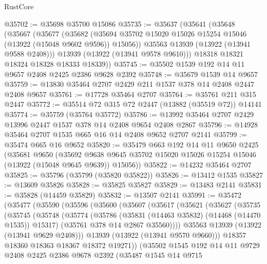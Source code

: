 \begin{lexlean}{RustCore}
\begin{coremodule}
@35702 := @35698 @35700 @15086
@35735 := @35637
    (@35641
      (@35648
        (@35667
          (@35677
            (@35682
              (@35694 @35702 @15020 @15026 @15254 @15046 (@13922 (@15048 @9602 @9596)) @15056))
            @35563
            @13939
            (@13922 (@13941 @9588 @2408)))
          @13939
          (@13922 (@13941 @9578 @9610)))
        @18318
        @18321
        @18324
        @18328
        @18333
        @18339))
@35745 := @35502 @1539 @192 @14 @11 @9657 @2408 @2425 @2386 @9628 @2392
@35748 := @35679 @1539 @14 @9657
@35759 := @13830 @35464 @2707 @2429 @211 @1537 @378 @14 @2408 @2447 @2408 @9657
@35761 := @17728 @35464 @2707
@35764 := @35761 @211 @315 @2447
@35772 := @35514 @72 @315 @72 @2447 (@13882 (@35519 @72)) @14141
@35774 := @35759 (@35764 @35772)
@35786 := @13992 @35464 @2707 @2429 @13996 @2447 @1537 @378 @14 @2408 @9654 @2408 @2867
@35796 := @14928 @35464 @2707 @1535 @665 @16 @14 @2408 @9652 @2707 @2141
@35799 := @35474 @665 @16 @9652
@35820 := @35479
    @663
    @192
    @14
    @11
    @9650
    @2425
    (@35681
      @9650
      (@35692 @9638 @9645 @35702 @15020 @15026 @15254 @15046 (@13922 (@15048 @9645 @9639)) @15056))
@35822 := @14232 @35464 @2707
@35825 := @35796 (@35799 (@35820 @35822))
@35826 := @13412 @1535
@35827 := @13609 @35826
@35828 := @35825 @35827
@35829 := @13483 @2141
@35831 := @35828 (@14459 @35829)
@35832 := @13507 @2141
@35991 := @35472
    (@35477
      (@35590
        (@35596
          (@35600
            (@35607
              (@35617
                (@35621
                  (@35627
                    (@35735
                      (@35745
                        (@35748
                          (@35774
                            (@35786
                              (@35831 (@14463 @35832) (@14468 (@14470 @1535)) @15317)
                              (@35761 @378 @14 @2867 @35560))))
                        @35563
                        @13939
                        (@13922 (@13941 @9629 @2408)))
                      @13939
                      (@13922 (@13941 @9570 @9660)))
                    @18357
                    @18360
                    @18363
                    @18367
                    @18372
                    @19271))
                (@35502
                  @1545
                  @192
                  @14
                  @11
                  @9729
                  @2408
                  @2425
                  @2386
                  @9678
                  @2392
                  (@35487
                    @1545
                    @14
                    @9715

\end{coremodule}
\end{lexlean}

